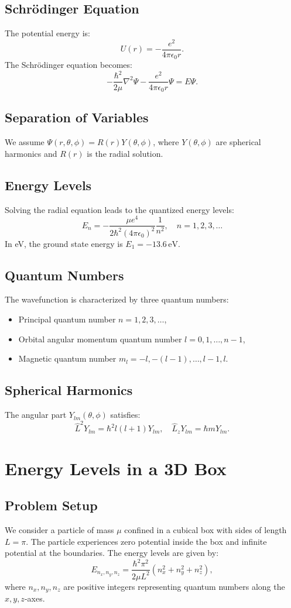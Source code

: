 \documentclass[a4paper,12pt]{article}
\begin{document}
\begin{multicols}{2}
\subsection*{Schrödinger Equation}
The potential energy is:
\[
U(r) = -\frac{e^2}{4\pi \epsilon_0 r}.
\]
The Schrödinger equation becomes:
\[
-\frac{\hbar^2}{2\mu} \nabla^2 \Psi - \frac{e^2}{4\pi \epsilon_0 r} \Psi = E \Psi.
\]

\subsection*{Separation of Variables}
We assume \( \Psi(r,\theta,\phi) = R(r) Y(\theta, \phi) \), where \( Y(\theta, \phi) \) are spherical harmonics and \( R(r) \) is the radial solution.

\subsection*{Energy Levels}
Solving the radial equation leads to the quantized energy levels:
\[
E_n = -\frac{\mu e^4}{2 \hbar^2 (4\pi \epsilon_0)^2} \frac{1}{n^2}, \quad n = 1, 2, 3, \ldots
\]
In eV, the ground state energy is \( E_1 = -13.6 \, \mathrm{eV} \).

\subsection*{Quantum Numbers}
The wavefunction is characterized by three quantum numbers:
\begin{itemize}
    \item Principal quantum number \( n = 1, 2, 3, \ldots \),
    \item Orbital angular momentum quantum number \( l = 0, 1, \ldots, n-1 \),
    \item Magnetic quantum number \( m_l = -l, -(l-1), \ldots, l-1, l \).
\end{itemize}

\subsection*{Spherical Harmonics}
The angular part \( Y_{lm}(\theta, \phi) \) satisfies:
\[
\hat{L}^2 Y_{lm} = \hbar^2 l(l+1) Y_{lm}, \quad \hat{L}_z Y_{lm} = \hbar m Y_{lm}.
\]

\section*{Energy Levels in a 3D Box}
\subsection*{Problem Setup}
We consider a particle of mass \( \mu \) confined in a cubical box with sides of length \( L = \pi \). The particle experiences zero potential inside the box and infinite potential at the boundaries. The energy levels are given by:
\[
E_{n_x, n_y, n_z} = \frac{\hbar^2 \pi^2}{2\mu L^2} \left(n_x^2 + n_y^2 + n_z^2 \right),
\]
where \( n_x, n_y, n_z \) are positive integers representing quantum numbers along the \( x, y, z \)-axes.


\end{multicols}
\end{document}
